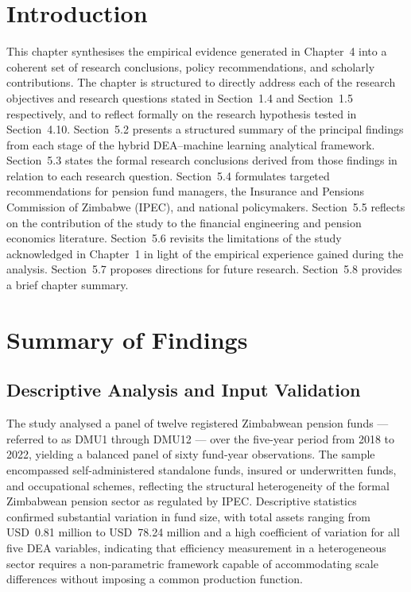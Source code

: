 \documentclass[12pt,a4paper]{article}
\begin{document}
\vspace{1cm}

\section{Introduction}

This chapter synthesises the empirical evidence generated in Chapter~4 into a coherent set of research conclusions, policy recommendations, and scholarly contributions. The chapter is structured to directly address each of the research objectives and research questions stated in Section~1.4 and Section~1.5 respectively, and to reflect formally on the research hypothesis tested in Section~4.10. Section~5.2 presents a structured summary of the principal findings from each stage of the hybrid DEA--machine learning analytical framework. Section~5.3 states the formal research conclusions derived from those findings in relation to each research question. Section~5.4 formulates targeted recommendations for pension fund managers, the Insurance and Pensions Commission of Zimbabwe (IPEC), and national policymakers. Section~5.5 reflects on the contribution of the study to the financial engineering and pension economics literature. Section~5.6 revisits the limitations of the study acknowledged in Chapter~1 in light of the empirical experience gained during the analysis. Section~5.7 proposes directions for future research. Section~5.8 provides a brief chapter summary.

\section{Summary of Findings}

\subsection{Descriptive Analysis and Input Validation}

The study analysed a panel of twelve registered Zimbabwean pension funds --- referred to as DMU1 through DMU12 --- over the five-year period from 2018 to 2022, yielding a balanced panel of sixty fund-year observations. The sample encompassed self-administered standalone funds, insured or underwritten funds, and occupational schemes, reflecting the structural heterogeneity of the formal Zimbabwean pension sector as regulated by IPEC. Descriptive statistics confirmed substantial variation in fund size, with total assets ranging from USD~0.81 million to USD~78.24 million and a high coefficient of variation for all five DEA variables, indicating that efficiency measurement in a heterogeneous sector requires a non-parametric framework capable of accommodating scale differences without imposing a common production function.
\end{document}
